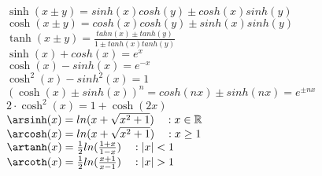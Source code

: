 $\sinh(x\pm y)=sinh(x)cosh(y)\pm cosh(x)sinh(y)$\\
$\cosh(x\pm y)=cosh(x)cosh(y)\pm sinh(x)sinh(y)$\\
$\tanh(x\pm y)=\frac{tahn(x)\pm tanh(y)}{1\pm tanh(x)tanh(y)}$\\

$\sinh(x)+cosh(x)=e^x$\\
$\cosh(x)-sinh(x)=e^{-x}$\\

$\cosh^2(x)-sinh^2(x)=1$\\
$(\cosh(x)\pm sinh(x))^n=cosh(nx)\pm sinh(nx)=e^{\pm nx}$\\

$2\cdot \cosh^2(x) = 1+\cosh(2x)$\\

$\arsinh(x)=ln(x+\sqrt{x^2+1})\quad :x\in\mathbb{R}$\\
$\arcosh(x)=ln(x+\sqrt{x^2+1})\quad :x\ge 1$\\
$\artanh(x)={1\over2}ln(\frac{1+x}{1-x})\quad :|x|< 1$\\
$\arcoth(x)={1\over2}ln(\frac{x+1}{x-1})\quad :|x|> 1$\\
